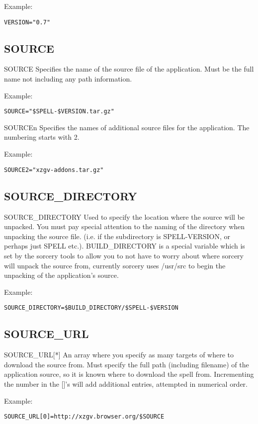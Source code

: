 \documentclass[a4paper,10pt]{book}
\begin{document}
Example:
\begin{verbatim}
VERSION="0.7"
\end{verbatim}

\subsection{SOURCE}
SOURCE
	Specifies the name of the source file of the application. Must be the
	full name not including any path information.

Example:
\begin{verbatim}
SOURCE="$SPELL-$VERSION.tar.gz"
\end{verbatim}

SOURCEn
	Specifies the names of additional source files for the application.
	The numbering starts with 2.

Example:
\begin{verbatim}
SOURCE2="xzgv-addons.tar.gz"
\end{verbatim}

\subsection{SOURCE\_DIRECTORY}
SOURCE\_DIRECTORY
	Used to specify the location where the source will be unpacked. You
	must pay special attention to the naming of the directory when
	unpacking the source file. (i.e. if the subdirectory is
	\textdollar SPELL-\textdollar VERSION, or perhaps just \textdollar
SPELL etc.). \textdollar BUILD\_DIRECTORY is a
	special variable which is set by the sorcery tools to allow you to
	not have to worry about where sorcery will unpack the source from,
	currently sorcery uses /usr/src to begin the unpacking of the
	application's source.

Example:
\begin{verbatim}
SOURCE_DIRECTORY=$BUILD_DIRECTORY/$SPELL-$VERSION
\end{verbatim}

\subsection{SOURCE\_URL}
SOURCE\_URL[*]
	An array where you specify as many targets of where to download the
	source from. Must specify the full path (including filename) of the
	application source, so it is known where to download the spell from.
	Incrementing the number in the []'s will add additional entries,
	attempted in numerical order.

Example:
\begin{verbatim}
SOURCE_URL[0]=http://xzgv.browser.org/$SOURCE
\end{verbatim}
\end{document}

